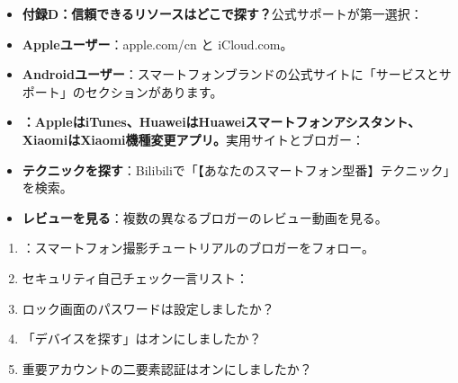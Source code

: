 

\begin{itemize}
  \item \textbf{付録D：信頼できるリソースはどこで探す？}公式サポートが第一選択：
  \item \textbf{Appleユーザー}：apple.com/cn と iCloud.com。
  \item \textbf{Androidユーザー}：スマートフォンブランドの公式サイトに「サービスとサポート」のセクションがあります。
\end{itemize}


\begin{itemize}
  \item \textbf{：AppleはiTunes、HuaweiはHuaweiスマートフォンアシスタント、XiaomiはXiaomi機種変更アプリ。}実用サイトとブロガー：
  \item \textbf{テクニックを探す}：Bilibiliで「【あなたのスマートフォン型番】テクニック」を検索。
  \item \textbf{レビューを見る}：複数の異なるブロガーのレビュー動画を見る。
\end{itemize}


\begin{enumerate}
  \item ：スマートフォン撮影チュートリアルのブロガーをフォロー。
  \item セキュリティ自己チェック一言リスト：
  \item ロック画面のパスワードは設定しましたか？
  \item 「デバイスを探す」はオンにしましたか？
  \item 重要アカウントの二要素認証はオンにしましたか？
\end{enumerate}
